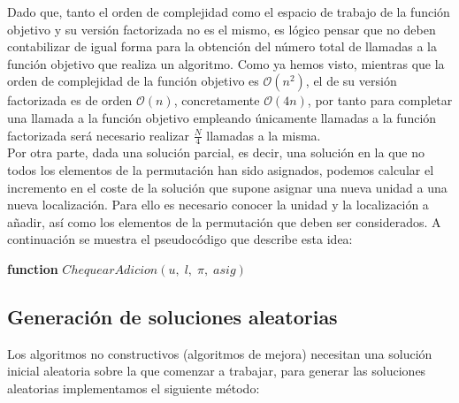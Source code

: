 \documentclass[11pt,a4paper]{article}
\begin{document}
		\noindent Dado que, tanto el orden de complejidad como el espacio de trabajo de la función objetivo y su versión factorizada no es el mismo, es lógico pensar que no deben contabilizar de igual forma para la obtención del número total de llamadas a la función objetivo que realiza un algoritmo. Como ya hemos visto, mientras que la orden de complejidad de la función objetivo es $\mathcal{O}(n^2)$, el de su versión factorizada es de orden $\mathcal{O}(n)$, concretamente $\mathcal{O}(4n)$, por tanto para completar una llamada a la función objetivo empleando únicamente llamadas a la función factorizada será necesario realizar $\frac{N}{4}$ llamadas a la misma.\\
		
		\noindent Por otra parte, dada una solución parcial, es decir, una solución en la que no todos los elementos de la permutación han sido asignados, podemos calcular el incremento en el coste de la solución que supone asignar una nueva unidad a una nueva localización. Para ello es necesario conocer la unidad y la localización a añadir, así como los elementos de la permutación que deben ser considerados. A continuación se muestra el pseudocódigo que describe esta idea:
		
		\begin{algorithm}
			\textbf{function} $ChequearAdicion(u,\; l,\; \pi,\;asig)$
			
		\end{algorithm}
		
	\subsection{Generación de soluciones aleatorias}
	
		\noindent Los algoritmos no constructivos (algoritmos de mejora) necesitan una solución inicial aleatoria sobre la que comenzar a trabajar, para generar las soluciones aleatorias implementamos el siguiente método:\\
		
\end{document}
